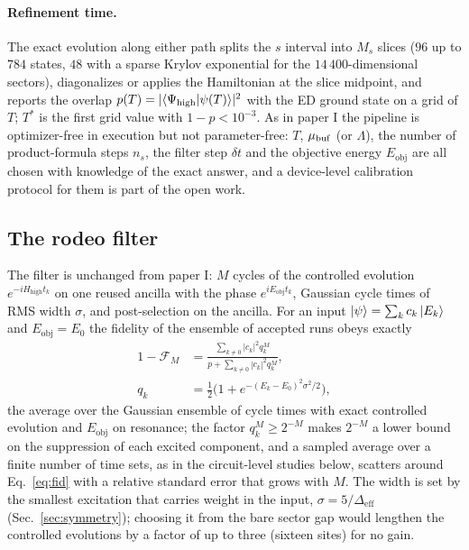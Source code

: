 \documentclass[a4paper,11pt,noarxiv]{quantumarticle}
\newcommand{\Hhigh}{H_{\mathrm{high}}}
\newcommand{\Eobj}{E_{\mathrm{obj}}}
\newcommand{\Deff}{\Delta_{\mathrm{eff}}}
\begin{document}
\paragraph{Refinement time.}
The exact evolution along either path splits the $s$ interval into $M_s$
slices ($96$ up to $784$ states, $48$ with a sparse Krylov exponential for
the $14\,400$-dimensional sectors), diagonalizes or applies the Hamiltonian
at the slice midpoint, and reports the overlap
$p(T)=|\langle\Psi_{\rm high}|\psi(T)\rangle|^2$ with the ED ground state on
a grid of $T$; $T^*$ is the first grid value with $1-p<10^{-3}$.  As in
paper I the pipeline is optimizer-free in execution but not parameter-free:
$T$, $\mu_{\rm buf}$ (or $\Lambda$), the number of product-formula steps
$n_s$, the filter step $\delta t$ and the objective energy $\Eobj$ are all
chosen with knowledge of the exact answer, and a device-level calibration
protocol for them is part of the open work.

\subsection{The rodeo filter}
\label{sec:rodeo}
The filter is unchanged from paper I: $M$ cycles of the controlled
evolution $e^{-i\Hhigh t_k}$ on one reused ancilla with the phase
$e^{i\Eobj t_k}$, Gaussian cycle times of RMS width $\sigma$, and
post-selection on the ancilla.  For an input $\ket\psi=\sum_kc_k\ket{E_k}$
and $\Eobj=E_0$ the fidelity of the ensemble of accepted runs obeys exactly
\begin{align}
  1-\mathcal F_M&=\frac{\sum_{k\neq0}|c_k|^2q_k^M}{p+\sum_{k\neq0}|c_k|^2q_k^M},\nonumber\\
  q_k&=\tfrac12\big(1+e^{-(E_k-E_0)^2\sigma^2/2}\big),
  \label{eq:fid}
\end{align}
the average over the Gaussian ensemble of cycle times with exact controlled
evolution and $\Eobj$ on resonance; the factor $q_k^M\ge2^{-M}$ makes
$2^{-M}$ a lower bound on the suppression of each excited component, and a
sampled average over a finite number of time sets, as in the circuit-level
studies below, scatters around Eq.~\eqref{eq:fid} with a relative standard
error that grows with $M$.  The width is set by the smallest excitation that
carries weight in the input, $\sigma=5/\Deff$ (Sec.~\ref{sec:symmetry});
choosing it from the bare sector gap would lengthen the controlled
evolutions by a factor of up to three (sixteen sites) for no gain.
\end{document}
